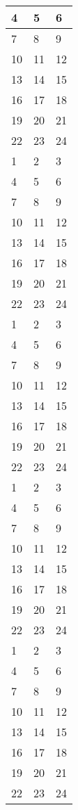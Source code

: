 \begin{justify}
\begin{longtable}{|p{4.75cm}|p{4.7cm}|p{4.75cm}|}
4 & 5 & 6 \\ \hline
7 & 8 & 9 \\ \hline
10 & 11 & 12 \\ \hline
13 & 14 & 15 \\ \hline
16 & 17 & 18 \\ \hline
19 & 20 & 21 \\ \hline
22 & 23 & 24 \\ \hline
1 & 2 & 3 \\ \hline
4 & 5 & 6 \\ \hline
7 & 8 & 9 \\ \hline
10 & 11 & 12 \\ \hline
13 & 14 & 15 \\ \hline
16 & 17 & 18 \\ \hline
19 & 20 & 21 \\ \hline
22 & 23 & 24 \\ \hline
1 & 2 & 3 \\ \hline
4 & 5 & 6 \\ \hline
7 & 8 & 9 \\ \hline
10 & 11 & 12 \\ \hline
13 & 14 & 15 \\ \hline
16 & 17 & 18 \\ \hline
19 & 20 & 21 \\ \hline
22 & 23 & 24 \\ \hline
1 & 2 & 3 \\ \hline
4 & 5 & 6 \\ \hline
7 & 8 & 9 \\ \hline
10 & 11 & 12 \\ \hline
13 & 14 & 15 \\ \hline
16 & 17 & 18 \\ \hline
19 & 20 & 21 \\ \hline
22 & 23 & 24 \\ \hline
1 & 2 & 3 \\ \hline
4 & 5 & 6 \\ \hline
7 & 8 & 9 \\ \hline
10 & 11 & 12 \\ \hline
13 & 14 & 15 \\ \hline
16 & 17 & 18 \\ \hline
19 & 20 & 21 \\ \hline
22 & 23 & 24 \\ \hline
\end{longtable}




\end{justify}
\clearpage
